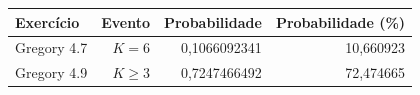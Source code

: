 \begin{tabular}{lrrr}
\toprule
Exercício & Evento & Probabilidade & Probabilidade (\%) \\
\midrule
Gregory 4.7 & $K=6$ & 0,1066092341 & 10,660923 \\
Gregory 4.9 & $K\geq3$ & 0,7247466492 & 72,474665 \\
\bottomrule
\end{tabular}

